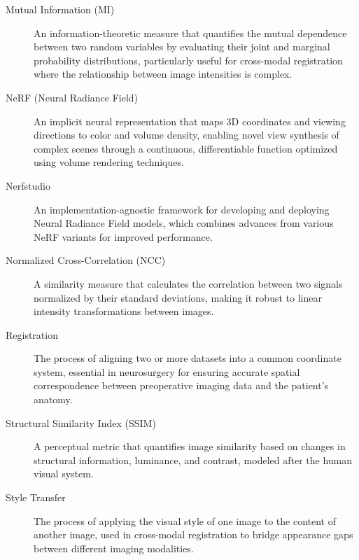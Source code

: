 \begin{description}
    \item[Mutual Information (MI)] An information-theoretic measure that quantifies the mutual dependence between two random variables by evaluating their joint and marginal probability distributions, particularly useful for cross-modal registration where the relationship between image intensities is complex.
    
    \item[NeRF (Neural Radiance Field)] An implicit neural representation that maps 3D coordinates and viewing directions to color and volume density, enabling novel view synthesis of complex scenes through a continuous, differentiable function optimized using volume rendering techniques.
    
    \item[Nerfstudio] An implementation-agnostic framework for developing and deploying Neural Radiance Field models, which combines advances from various NeRF variants for improved performance.
    
    \item[Normalized Cross-Correlation (NCC)] A similarity measure that calculates the correlation between two signals normalized by their standard deviations, making it robust to linear intensity transformations between images.
    
    \item[Registration] The process of aligning two or more datasets into a common coordinate system, essential in neurosurgery for ensuring accurate spatial correspondence between preoperative imaging data and the patient's anatomy.
    
    \item[Structural Similarity Index (SSIM)] A perceptual metric that quantifies image similarity based on changes in structural information, luminance, and contrast, modeled after the human visual system.
    
    \item[Style Transfer] The process of applying the visual style of one image to the content of another image, used in cross-modal registration to bridge appearance gaps between different imaging modalities.
\end{description}